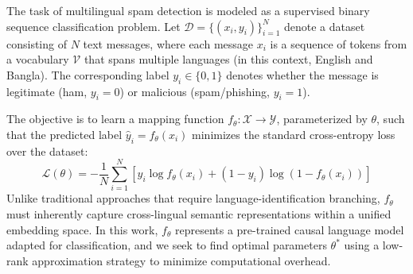 \documentclass[journal]{IEEEtran}
\begin{document}
The task of multilingual spam detection is modeled as a supervised binary sequence classification problem. Let $\mathcal{D} = \{(x_i, y_i)\}_{i=1}^{N}$ denote a dataset consisting of $N$ text messages, where each message $x_i$ is a sequence of tokens from a vocabulary $\mathcal{V}$ that spans multiple languages (in this context, English and Bangla). The corresponding label $y_i \in \{0, 1\}$ denotes whether the message is legitimate (ham, $y_i = 0$) or malicious (spam/phishing, $y_i = 1$). 

The objective is to learn a mapping function $f_\theta: \mathcal{X} \rightarrow \mathcal{Y}$, parameterized by $\theta$, such that the predicted label $\hat{y}_i = f_\theta(x_i)$ minimizes the standard cross-entropy loss over the dataset:
\begin{equation}
\mathcal{L}(\theta) = -\frac{1}{N} \sum_{i=1}^{N} \left[ y_i \log f_\theta(x_i) + (1 - y_i) \log (1 - f_\theta(x_i)) \right]
\end{equation}
Unlike traditional approaches that require language-identification branching, $f_\theta$ must inherently capture cross-lingual semantic representations within a unified embedding space. In this work, $f_\theta$ represents a pre-trained causal language model adapted for classification, and we seek to find optimal parameters $\theta^*$ using a low-rank approximation strategy to minimize computational overhead.
\end{document}
